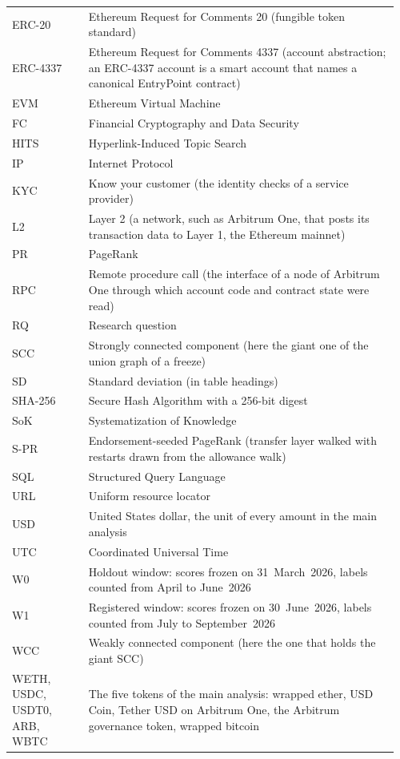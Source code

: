 \begin{longtable}{@{}>{\raggedright\arraybackslash}p{0.19\linewidth}p{0.77\linewidth}@{}}
ERC-20 & Ethereum Request for Comments 20 (fungible token standard) \\
ERC-4337 & Ethereum Request for Comments 4337 (account abstraction; an ERC-4337 account is a smart account that names a canonical EntryPoint contract) \\
EVM & Ethereum Virtual Machine \\
FC & Financial Cryptography and Data Security \\
HITS & Hyperlink-Induced Topic Search \\
IP & Internet Protocol \\
KYC & Know your customer (the identity checks of a service provider) \\
L2 & Layer 2 (a network, such as Arbitrum One, that posts its transaction data to Layer 1, the Ethereum mainnet) \\
PR & PageRank \\
RPC & Remote procedure call (the interface of a node of Arbitrum One through which account code and contract state were read) \\
RQ & Research question \\
SCC & Strongly connected component (here the giant one of the union graph of a freeze) \\
SD & Standard deviation (in table headings) \\
SHA-256 & Secure Hash Algorithm with a 256-bit digest \\
SoK & Systematization of Knowledge \\
\mbox{S-PR} & Endorsement-seeded PageRank (transfer layer walked with restarts drawn from the allowance walk) \\
SQL & Structured Query Language \\
URL & Uniform resource locator \\
USD & United States dollar, the unit of every amount in the main analysis \\
UTC & Coordinated Universal Time \\
W0 & Holdout window: scores frozen on 31~March~2026, labels counted from April to June~2026 \\
W1 & Registered window: scores frozen on 30~June~2026, labels counted from July to September~2026 \\
WCC & Weakly connected component (here the one that holds the giant SCC) \\
WETH, USDC, USDT0, ARB, WBTC & The five tokens of the main analysis: wrapped ether, USD Coin, Tether USD on Arbitrum One, the Arbitrum governance token, wrapped bitcoin \\
\end{longtable}

